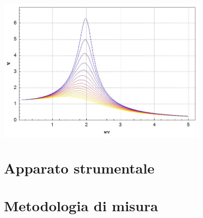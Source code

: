 \documentclass[10pt,a4paper]{article} %
\begin{document}
\maketitle %

\begin{center}
	\includegraphics[width=0.8\textwidth]{risonanza}
\end{center}

\begin{abstract}
	\noindent
	
\end{abstract}

\newpage



\tableofcontents %


\section{Apparato strumentale}
	

\section{Metodologia di misura}
	
\end{document}
